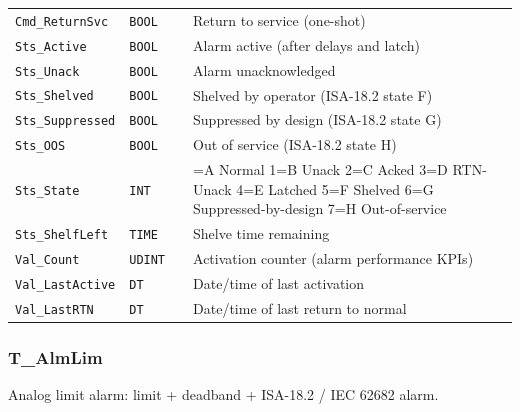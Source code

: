 {\begin{longtable}{@{}>{\raggedright\arraybackslash}p{3.4cm}>{\raggedright\arraybackslash}p{3.3cm}>{\raggedright\arraybackslash}p{1.3cm}>{\raggedright\arraybackslash}p{6.4cm}@{}}
\texttt{Cmd\_ReturnSvc} & \texttt{BOOL} &  & Return to service (one-shot) \\
\texttt{Sts\_Active} & \texttt{BOOL} &  & Alarm active (after delays and latch) \\
\texttt{Sts\_Unack} & \texttt{BOOL} &  & Alarm unacknowledged \\
\texttt{Sts\_Shelved} & \texttt{BOOL} &  & Shelved by operator (ISA-18.2 state F) \\
\texttt{Sts\_Suppressed} & \texttt{BOOL} &  & Suppressed by design (ISA-18.2 state G) \\
\texttt{Sts\_OOS} & \texttt{BOOL} &  & Out of service (ISA-18.2 state H) \\
\texttt{Sts\_State} & \texttt{INT} &  & 0=A Normal 1=B Unack 2=C Acked 3=D RTN-Unack 4=E Latched 5=F Shelved 6=G Suppressed-by-design 7=H Out-of-service \\
\texttt{Sts\_ShelfLeft} & \texttt{TIME} &  & Shelve time remaining \\
\texttt{Val\_Count} & \texttt{UDINT} &  & Activation counter (alarm performance KPIs) \\
\texttt{Val\_LastActive} & \texttt{DT} &  & Date/\allowbreak{}time of last activation \\
\texttt{Val\_LastRTN} & \texttt{DT} &  & Date/\allowbreak{}time of last return to normal \\
\bottomrule
\end{longtable}
}
\subsubsection*{T\_AlmLim}
\label{app:pclib:talmlim}
Analog limit alarm: limit + deadband + ISA-18.2 /\allowbreak{} IEC 62682 alarm.

